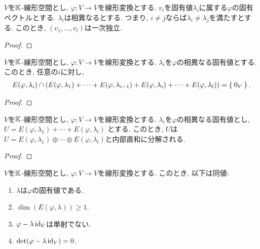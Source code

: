 \begin{prop}
  $V$を$\mathbb{K}$-線形空間とし,
  $\varphi\colon V\to V$を線形変換とする.
  $v_i$を固有値$\lambda_i$に属する$\varphi$の固有ベクトルとする.
  $\lambda_i$は相異なるとする.
  つまり, $i\neq j$ならば$\lambda_i \neq \lambda_j$を満たすとする.
  このとき,
  $(v_1,\ldots, v_l)$は一次独立.
\end{prop}
\begin{proof}\end{proof}

\begin{cor}
  $V$を$\mathbb{K}$-線形空間とし,
  $\varphi\colon V\to V$を線形変換とする.
  $\lambda_i$を$\varphi$の相異なる固有値とする.
  このとき, 任意の$i$に対し,
  \begin{align*}
    E(\varphi,\lambda_i)\cap(E(\varphi,\lambda_1)+\cdots +E(\varphi,\lambda_{i-1})+E(\varphi,\lambda_i)+\cdots +E(\varphi,\lambda_{l}))=\Set{0_V}.
  \end{align*}
\end{cor}
\begin{proof}\end{proof}

\begin{cor}
  $V$を$\mathbb{K}$-線形空間とし,
  $\varphi\colon V\to V$を線形変換とする.
  $\lambda_i$を$\varphi$の相異なる固有値とし,
  $U=E(\varphi,\lambda_1)+\cdots +E(\varphi,\lambda_{l})$
  とする.
  このとき, $U$は$U=E(\varphi,\lambda_1)\oplus \cdots \oplus E(\varphi,\lambda_{l})$と内部直和に分解される.
\end{cor}
\begin{proof}\end{proof}

\begin{prop}
  $V$を$\mathbb{K}$-線形空間とし,
  $\varphi\colon V\to V$を線形変換とする.
  このとき, 以下は同値:
  \begin{enumerate}
  \item $\lambda$は$\varphi$の固有値である.
  \item $\dim(E(\varphi,\lambda))\geq 1$.
  \item $\varphi-\lambda\operatorname{id}_V$は単射でない.
  \item $\det(\varphi-\lambda\operatorname{id}_V)=0$.    
  \end{enumerate}
\end{prop}

